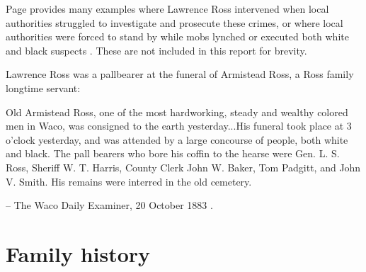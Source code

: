 \documentclass[12pt]{article}
\begin{document}
Page provides many examples where Lawrence Ross intervened when local authorities struggled to investigate and prosecute these crimes, or where local authorities were forced to stand by while mobs lynched or executed both white and black suspects \cite[pg. 95--155, etc]{page}. These are not included in this report for brevity.

Lawrence Ross was a pallbearer at the funeral of Armistead Ross, a Ross family longtime servant:
\begin{displayquote}
Old Armistead Ross, one of the most hardworking, steady and wealthy colored men in Waco, was consigned to the earth yesterday...His funeral took place at 3 o’clock yesterday, and was attended by a large concourse of people, both white and black. The pall bearers who bore his coffin to the hearse were Gen. L. S. Ross, Sheriff W. T. Harris, County Clerk John W. Baker, Tom Padgitt, and John V. Smith. His remains were interred in the old cemetery.

-- The Waco Daily Examiner, 20 October 1883 \cite{wde:1883-10-20}.
\end{displayquote}



\newpage
\section{Family history}
\end{document}
